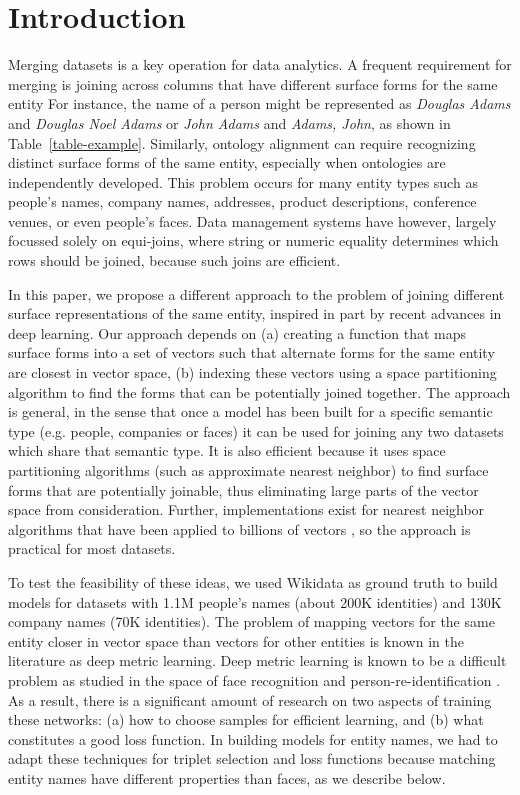 \section{Introduction}

Merging datasets is a key operation for data analytics.  A frequent
requirement for merging is joining across columns that have
different surface forms for the same entity  For instance, the name of a person might be represented as \textit{Douglas Adams} and \textit{Douglas Noel Adams} or \textit{John Adams} and \textit{Adams, John}, as shown in Table~\ref{table-example}.  Similarly,
ontology alignment can require recognizing distinct surface forms of
the same entity, especially when ontologies are independently
developed.  This problem occurs for many entity types such as people's names, company names, addresses, product descriptions, conference venues, or even people's faces.  Data management systems have however, largely focussed solely on equi-joins, where string or numeric equality determines which rows should be joined, because such joins are efficient.

In this paper, we propose a different approach to the problem of joining different surface representations of the same entity, inspired in part by recent advances in deep learning.  Our approach depends on (a) creating a function that maps surface forms into a set of vectors such that alternate forms for the same entity are closest in vector space, (b) indexing these vectors using a space partitioning algorithm to find the forms that can be potentially joined together.  The approach is general, in the sense that once a model has been built for a specific semantic type (e.g. people, companies or faces) it can be used for joining any two datasets which share that semantic type.  It is also efficient because it uses space partitioning algorithms (such as approximate nearest neighbor) to find surface forms that are potentially joinable, thus eliminating large parts of the vector space from consideration.  Further, implementations exist for nearest neighbor algorithms that have been applied to billions of vectors \cite{JDH17}, so the approach is practical for most datasets.  

To test the feasibility of these ideas, we used Wikidata as ground truth to build models for datasets with 1.1M people's names (about 200K identities) and 130K company names (70K identities).  The problem of mapping vectors for the same entity closer in vector space than vectors for other entities is known in the literature as deep metric learning.  Deep metric learning is known to be a difficult problem as studied in the space of face recognition and person-re-identification \cite{DBLP:conf/cvpr/SchroffKP15}.  As a result, there is a significant amount of research on two aspects of training these networks: (a) how to choose samples for efficient learning, and (b) what constitutes a good loss function.  In building models for entity names, we had to adapt these techniques for triplet selection and loss functions because matching entity names have different properties than faces, as we describe below.

